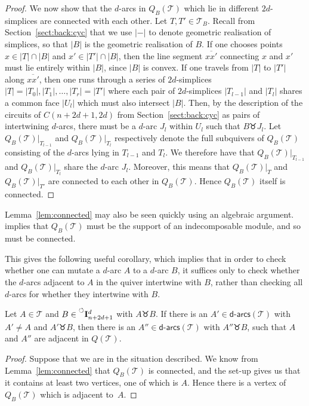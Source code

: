 \documentclass[ALCO,Unicode,published]{cedram}
\newcommand{\nonconsec}[2]{\prescript{\circlearrowleft}{}{\mathbf{I}_{#1}^{#2}}}
\newcommand{\seg}[2]{\overline{#1#2}} %
\newcommand{\darcs}[1]{\mathsf{d}\text{-}\mathsf{arcs}(#1)} %
\newcommand{\swr}{\taurus} %
\begin{document}
\begin{proof}
We now show that the $d$-arcs in $Q_{B}(\mathcal{T})$ which lie in different $2d$-simplices are connected with each other. Let $T, T' \in \mathcal{T}_{B}$. Recall from Section~\ref{sect:back:cyc} that we use $|-|$ to denote geometric realisation of simplices, so that $|B|$ is the geometric realisation of $B$. If one chooses points $x \in |T| \cap |B|$ and $x' \in |T'| \cap |B|$, then the line segment $\seg{x}{x'}$ connecting $x$ and $x'$ must lie entirely within $|B|$, since $|B|$ is convex. If one travels from $|T|$ to $|T'|$ along $\seg{x}{x'}$, then one runs through a series of $2d$-simplices $|T| = |T_{0}|, |T_{1}|, \dots, |T_{r}| = |T'|$ where each pair of $2d$-simplices $|T_{l - 1}|$ and $|T_{l}|$ shares a common face $|U_l|$ which must also intersect $|B|$. Then, by the description of the circuits of $C(n + 2d + 1, 2d)$ from Section~\ref{sect:back:cyc} as pairs of intertwining $d$-arcs, there must be a $d$-arc $J_{l}$ within $U_{l}$ such that $B \swr J_{l}$. Let $Q_{B}(\mathcal{T})|_{T_{l - 1}}$ and $Q_{B}(\mathcal{T})|_{T_{l}}$ respectively denote the full subquivers of $Q_{B}(\mathcal{T})$ consisting of the $d$-arcs lying in $T_{l - 1}$ and $T_{l}$. We therefore have that $Q_{B}(\mathcal{T})|_{T_{l - 1}}$ and $Q_{B}(\mathcal{T})|_{T_{l}}$ share the $d$-arc $J_{l}$. Moreover, this means that $Q_{B}(\mathcal{T})|_{T}$ and $Q_{B}(\mathcal{T})|_{T'}$ are connected to each other in $Q_{B}(\mathcal{T})$. Hence $Q_{B}(\mathcal{T})$ itself is connected.
\end{proof}

\begin{rema}
Lemma~\ref{lem:connected} may also be seen quickly using an algebraic argument. \cite[Theorem 5.6]{ot} implies that $Q_{B}(\mathcal{T})$ must be the support of an indecomposable module, and so must be connected.
\end{rema}

This gives the following useful corollary, which implies that in order to check whether one can mutate a $d$-arc $A$ to a $d$-arc $B$, it suffices only to check whether the $d$-arcs adjacent to $A$ in the quiver intertwine with $B$, rather than checking all $d$-arcs for whether they intertwine with $B$.

\begin{coro}\label{cor:adj_suff}
Let $A \in \mathcal{T}$ and $B \in \nonconsec{n+2d+1}{d}$ with $A \swr B$. If there is an $A' \in \darcs{\mathcal{T}}$ with $A' \neq A$ and $A' \swr B$, then there is an $A'' \in \darcs{\mathcal{T}}$ with $A'' \swr B$, such that $A$ and $A''$ are adjacent in $Q(\mathcal{T})$.
\end{coro}
\begin{proof}
Suppose that we are in the situation described. We know from Lemma~\ref{lem:connected} that $Q_{B}(\mathcal{T})$ is connected, and the set-up gives us that it contains at least two vertices, one of which is $A$. Hence there is a vertex of $Q_{B}(\mathcal{T})$ which is adjacent to~$A$.
\end{proof}
\end{document}
